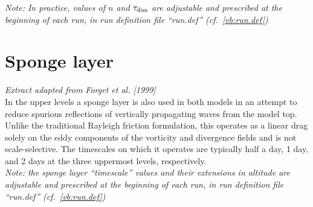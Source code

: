 {\it Note: In practice,
values of $n$ and $\tau_{\mbox{\scriptsize diss}}$
are adjustable and prescribed at the beginning of each run, in run definition file ``run.def'' (cf.~\ref{vb:run.def}) }

\section{Sponge layer}

{\it Extract adapted from Forget et al. [1999]}\\

In the upper levels a sponge layer is also used in both models
in an attempt to reduce
spurious reflections of vertically propagating waves from the model top.
Unlike the traditional Rayleigh friction formulation,
this operates as a linear drag
 solely on the eddy components of the vorticity and divergence
fields and is not scale-selective.  The timescales on which it operates
are
typically half a day, 1 day,  and 2 days
 at the three uppermost levels, respectively. \\

{\it Note: the sponge layer ``timescale'' values and their extensions in altitude
are adjustable and prescribed at the beginning of each run, in run definition file ``run.def'' (cf.~\ref{vb:run.def}) }







